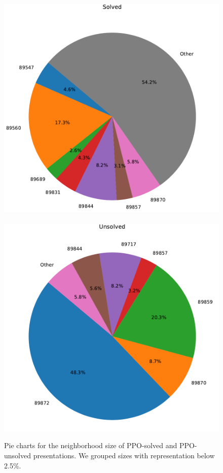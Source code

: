 \begin{figure}
	\centering
	\includegraphics[scale=.35]{fig/prime_solved_pie_rl_cropped.pdf}
	\
	\includegraphics[scale=.35]{fig/prime_unsolved_pie_rl_cropped.pdf}
	\caption{Pie charts for the neighborhood size of PPO-solved and PPO-unsolved presentations. We grouped sizes with representation below 2.5\%.}
	\label{fig:prime_pies}
\end{figure}

